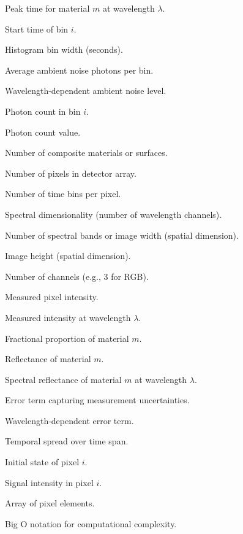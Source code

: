 \documentclass[12pt,a4paper,oneside]{report}
\begin{document}
{{\begin{description}[leftmargin=1.8cm, style=nextline, itemsep=4pt]
    \item[$t_{0,m,\lambda}$] Peak time for material $m$ at wavelength $\lambda$.
    \item[$t_i$] Start time of bin $i$.
    \item[$\Delta t$] Histogram bin width (seconds).
    \item[$b$] Average ambient noise photons per bin.
    \item[$b_\lambda$] Wavelength-dependent ambient noise level.
    \item[$h_i$] Photon count in bin $i$.
    \item[$k$] Photon count value.
    \item[$M$] Number of composite materials or surfaces.
    \item[$N$] Number of pixels in detector array.
    \item[$B$] Number of time bins per pixel.
    \item[$K$] Spectral dimensionality (number of wavelength channels).
    \item[$W$] Number of spectral bands or image width (spatial dimension).
    \item[$H$] Image height (spatial dimension).
    \item[$C$] Number of channels (e.g., 3 for RGB).
    \item[$U$] Measured pixel intensity.
    \item[$U_\lambda$] Measured intensity at wavelength $\lambda$.
    \item[$p_m$] Fractional proportion of material $m$.
    \item[$r_m$] Reflectance of material $m$.
    \item[$r_{m,\lambda}$] Spectral reflectance of material $m$ at wavelength $\lambda$.
    \item[$\epsilon$] Error term capturing measurement uncertainties.
    \item[$\epsilon_\lambda$] Wavelength-dependent error term.
    \item[$T_B$] Temporal spread over time span.
    \item[$I_{\text{pix},i}$] Initial state of pixel $i$.
    \item[$I_{\text{sig},i}$] Signal intensity in pixel $i$.
    \item[$\mathbf{D}$] Array of pixel elements.
    \item[$\mathcal{O}(\cdot)$] Big O notation for computational complexity.
\end{description}%
}
}
\vspace*{\fill}
\newpage
\end{document}
